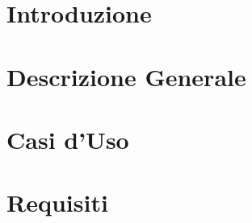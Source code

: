 \documentclass[]{article}
\begin{document}
	
	\newpage


	\section{Introduzione}
	
	\newpage

	\section{Descrizione Generale}
	
	\newpage

	\section{Casi d'Uso}
	
	\newpage

	\section{Requisiti}
	
	\newpage
\end{document}
